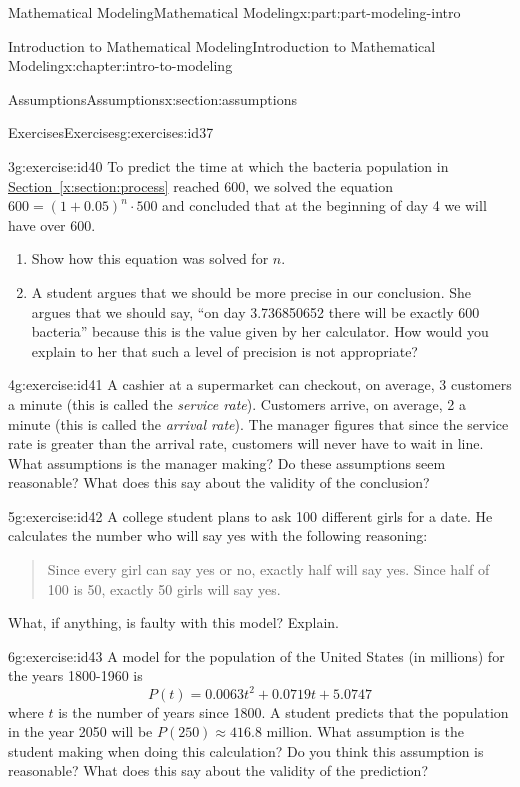 \documentclass[oneside,10pt,]{book}
\newcommand{\xreffont}{\relax}
\numberwithin{equation}{section}
\begin{document}
\begin{partptx}{Mathematical Modeling}{}{Mathematical Modeling}{}{}{x:part:part-modeling-intro}
\begin{chapterptx}{Introduction to Mathematical Modeling}{}{Introduction to Mathematical Modeling}{}{}{x:chapter:intro-to-modeling}
\begin{sectionptx}{Assumptions}{}{Assumptions}{}{}{x:section:assumptions}
\begin{exercises-subsection-numberless}{Exercises}{}{Exercises}{}{}{g:exercises:id37}
\begin{divisionexercise}{3}{}{}{g:exercise:id40}
To predict the time at which the bacteria population in \hyperref[x:section:process]{Section~{\xreffont\ref{x:section:process}}} reached 600, we solved the equation \(600 = (1 + 0.05)^n \cdot 500\) and concluded that at the beginning of day 4 we will have over 600.\begin{enumerate}[font=\bfseries,label=(\alph*),ref=\alph*]
\item{}Show how this equation was solved for \(n\).%
\item{}A student argues that we should be more precise in our conclusion. She argues that we should say, “on day 3.736850652 there will be exactly 600 bacteria” because this is the value given by her calculator. How would you explain to her that such a level of precision is not appropriate?%
\end{enumerate}
\end{divisionexercise}%
\begin{divisionexercise}{4}{}{}{g:exercise:id41}%
A cashier at a supermarket can checkout, on average, 3 customers a minute (this is called the \emph{service rate}). Customers arrive, on average, 2 a minute (this is called the \emph{arrival rate}). The manager figures that since the service rate is greater than the arrival rate, customers will never have to wait in line. What assumptions is the manager making? Do these assumptions seem reasonable? What does this say about the validity of the conclusion?%
\end{divisionexercise}%
\begin{divisionexercise}{5}{}{}{g:exercise:id42}%
A college student plans to ask 100 different girls for a date. He calculates the number who will say yes with the following reasoning:%
\begin{quote}%
Since every girl can say yes or no, exactly half will say yes. Since half of 100 is 50, exactly 50 girls will say yes.\end{quote}
What, if anything, is faulty with this model? Explain.%
\end{divisionexercise}%
\begin{divisionexercise}{6}{}{}{g:exercise:id43}%
A model for the population of the United States (in millions) for the years 1800-1960 is%
%
\begin{equation*}
P(t) = 0.0063t^2 + 0.0719t + 5.0747
\end{equation*}
where \(t\) is the number of years since 1800. A student predicts that the population in the year 2050 will be \(P(250) \approx 416.8\) million. What assumption is the student making when doing this calculation? Do you think this assumption is reasonable? What does this say about the validity of the prediction?%

\end{divisionexercise}
\end{exercises-subsection-numberless}
\end{sectionptx}
\end{chapterptx}
\end{partptx}
\end{document}

